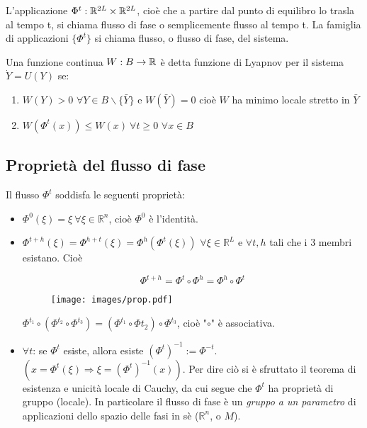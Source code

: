 \documentclass[Main.tex]{subfiles}
\begin{document}
\begin{df}
	L'applicazione $\Phi^t: \mathbb{R}^{2L} \times \mathbb{R}^{2L}$, cioè che a partire dal punto di equilibro lo trasla al tempo t, si chiama flusso di fase o semplicemente flusso al tempo t. La famiglia di applicazioni  $\{ \Phi^t \}$ si chiama flusso, o flusso di fase, del sistema.
\end{df}

\begin{df}
	Una funzione continua $W: B \rightarrow \mathbb{R}$ è detta funzione di Lyapnov per il sistema $\dot Y = U(Y)$ se:
	\begin{enumerate}
		\item $W(Y)>0$ $\forall Y\in B \backslash \{\bar Y\}  $ e $W(\bar Y)=0$ cioè $W$ ha minimo locale stretto in $\bar Y$ 
		\item $W(\Phi^t(x)) \leq W(x) \ \forall t \geq 0$ $\forall x \in B$
	\end{enumerate}
\end{df}

\newpage
\subsection{Proprietà del flusso di fase}

Il flusso $\Phi^t$ soddisfa le seguenti proprietà:
\begin{itemize}
	\item $\Phi^0 (\xi) = \xi \ \forall \xi \in \mathbb{R}^n$, cioè $\Phi^0$ è l'identità. 
	\item $\Phi^{t+h} (\xi) = \Phi^{h+t} (\xi) = \Phi^h(\Phi^t(\xi))$ $\forall \xi \in \mathbb{R}^L$ e $\forall t,h$ tali che i 3 membri  esistano. Cioè 
	 
	 \begin{equation}
  		\Phi^{t+h} = \Phi^t \circ \Phi^h = \Phi^h \circ \Phi^t
	\end{equation}

	
\begin{figure}[H]
    \centering
  \texttt{[image: images/prop.pdf]}
\end{figure}

\begin{osservazione}
	$\Phi^{t_1} \circ (\Phi ^{t_2} \circ \Phi^{t_3}) = ( \Phi^{t_1} \circ \Phi{t_2}) \circ \Phi^{t_3}$, cioè "$\circ$" è associativa.
\end{osservazione}
	\item $\forall t$: se $\Phi^t$ esiste, allora esiste $(\Phi^t)^{-1}:= \Phi^{-t}$. $(x = \Phi^t (\xi) \Rightarrow \xi =(\Phi^t)^{-1}(x) )$. Per dire ciò si è sfruttato il teorema di esistenza e unicità locale di Cauchy, da cui segue che $\Phi^t$ ha proprietà di gruppo (locale). In particolare il flusso di fase è un \emph{gruppo a un parametro} di applicazioni dello spazio delle fasi in sè ($\mathbb{R}^n$, o $M$).
\end{itemize}
\end{document}
